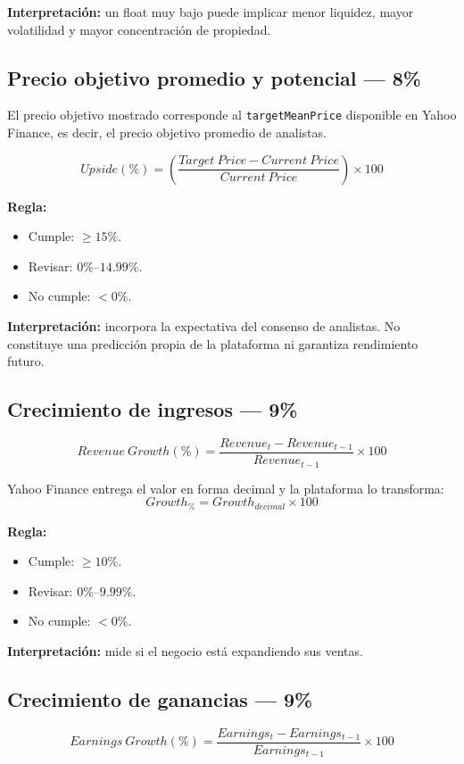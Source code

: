 \documentclass[11pt,a4paper]{article}
\begin{document}
\textbf{Interpretación:} un float muy bajo puede implicar menor liquidez, mayor volatilidad y mayor concentración de propiedad.

\subsection{Precio objetivo promedio y potencial --- 8\%}

El precio objetivo mostrado corresponde al \texttt{targetMeanPrice} disponible en Yahoo Finance, es decir, el precio objetivo promedio de analistas.

\[
\boxed{
Upside(\%)=
\left(
\frac{Target\ Price-Current\ Price}{Current\ Price}
\right)\times100
}
\]

\textbf{Regla:}
\begin{itemize}[leftmargin=*]
\item Cumple: $\geq15\%$.
\item Revisar: $0\%$--$14.99\%$.
\item No cumple: $<0\%$.
\end{itemize}

\textbf{Interpretación:} incorpora la expectativa del consenso de analistas. No constituye una predicción propia de la plataforma ni garantiza rendimiento futuro.

\subsection{Crecimiento de ingresos --- 9\%}
\[
\boxed{
Revenue\ Growth(\%)=
\frac{Revenue_t-Revenue_{t-1}}{Revenue_{t-1}}\times100
}
\]

Yahoo Finance entrega el valor en forma decimal y la plataforma lo transforma:
\[
Growth_{\%}=Growth_{decimal}\times100
\]

\textbf{Regla:}
\begin{itemize}[leftmargin=*]
\item Cumple: $\geq10\%$.
\item Revisar: $0\%$--$9.99\%$.
\item No cumple: $<0\%$.
\end{itemize}

\textbf{Interpretación:} mide si el negocio está expandiendo sus ventas.

\subsection{Crecimiento de ganancias --- 9\%}
\[
\boxed{
Earnings\ Growth(\%)=
\frac{Earnings_t-Earnings_{t-1}}{Earnings_{t-1}}\times100
}
\]
\end{document}
